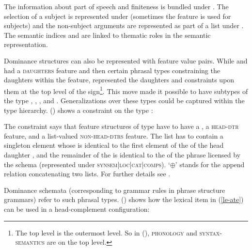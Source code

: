 \documentclass[output=paper
	        ,collection
	        ,collectionchapter
 	        ,biblatex
                ,babelshorthands
                ,newtxmath
                ,draftmode
                ,colorlinks, citecolor=brown
]{langscibook}
\begin{document}
\zs
The information about part of speech and finiteness is bundled under \head. The selection of a
subject is represented under \spr (sometimes the feature \subj is used for subjects) and the
non-subject arguments are represented as part of a list under \comps. The semantic indices 
and  are linked to thematic roles in the semantic representation.

Dominance structures can also be represented with feature value pairs. While \citet{ps} and
\citet{ps2} had a \textsc{daughters} feature and then certain phrasal types constraining the
daughters within the \dtrs feature, \citet{Sag97a} represented the daughters and constraints upon them at
the top level of the sign\footnote{
The top level is the outermost level. So in (), \textsc{phonology} and
\textsc{syntax-semantics} are on the top level.}. 
This move made it possible to have subtypes of the type , \eg
{}, , and
. Generalizations over these types could be captured within the type
hierarchy. () shows a constraint on the type :

\ea
\label{schema-bin-prel}
\z
The constraint says that feature structures of type  have to have a
\synsemv, a \textsc{head-dtr} feature, and a list-valued \textsc{non-head-dtrs} feature. The list has
to contain a singleton element whose \synsemv is identical to the first element of the \compsl
of the head daughter , and the remainder of the \compsl {} is identical to the
\compsv of the phrase licensed by the schema (represented under
\textsc{synsem|loc|cat|comps}). `$\oplus$'\is{$\oplus$} stands for the append relation concatenating
two lists. For further details see .

Dominance schemata (corresponding to grammar rules in phrase structure grammars) refer to such
phrasal types. () shows how the lexical item in (\ref{le-ate}) can be used in a
head-complement configuration:
\end{document}
